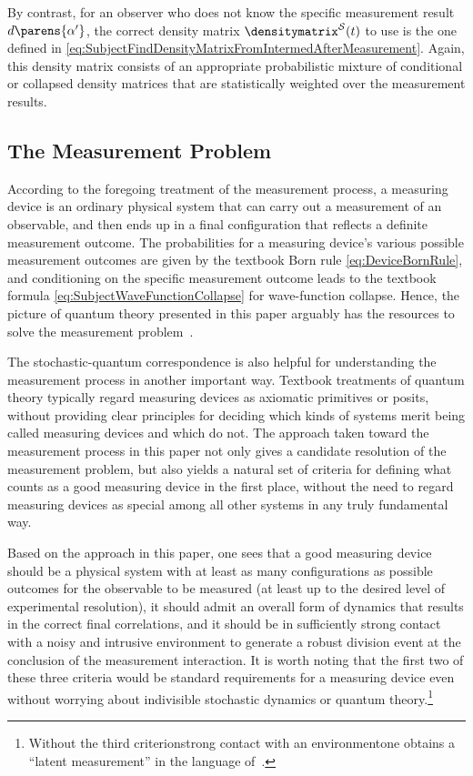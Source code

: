 \documentclass[12pt,english,prl,superscriptaddress,nobibnotes,nofootinbib]{revtex4-2}
\let\originalleft\left
\let\originalright\right
\renewcommand{\left}{\mathopen{}\mathclose\bgroup\originalleft}
\renewcommand{\right}{\aftergroup\egroup\originalright}
\begin{document}
By contrast, for an observer who does not know the specific measurement
result $d\parens{\alpha^{\prime}}$, the correct density matrix $\densitymatrix^{\mathcal{S}}\left(t\right)$
to use is the one defined in \eqref{eq:SubjectFindDensityMatrixFromIntermedAfterMeasurement}.
Again, this density matrix consists of an appropriate probabilistic
mixture of conditional or collapsed density matrices that are statistically
weighted over the measurement results.

\subsection{The Measurement Problem\label{subsec:The-Measurement-Problem}}

According to the foregoing treatment of the measurement process, a
measuring device is an ordinary physical system that can carry out
a measurement of an observable, and then ends up in a final configuration
that reflects a definite measurement outcome. The probabilities for
a measuring device's various possible measurement outcomes are given
by the textbook Born rule \eqref{eq:DeviceBornRule}, and conditioning
on the specific measurement outcome leads to the textbook formula
\eqref{eq:SubjectWaveFunctionCollapse} for wave-function collapse.
Hence, the picture of quantum theory presented in this paper arguably
has the resources to solve the measurement problem~\citep{Myrvold:2022piiqt}. 

The stochastic-quantum correspondence is also helpful for understanding
the measurement process in another important way. Textbook treatments
of quantum theory typically regard measuring devices as axiomatic
 primitives or posits, without providing clear principles for deciding
which kinds of systems merit being called measuring devices and which
do not. The approach taken toward the measurement process in this
paper not only gives a candidate resolution of the measurement problem,
but also yields a natural set of criteria for defining what counts
as a good measuring device in the first place, without the need to
regard measuring devices as special among all other systems in any
truly fundamental way.

Based on the approach in this paper, one sees that a good measuring
device should be a physical system with at least as many configurations
as possible outcomes for the observable to be measured (at least up
to the desired level of experimental resolution), it should admit
an overall form of dynamics that results in the correct final correlations,
and it should be in sufficiently strong contact with a noisy and intrusive
environment to generate a robust division event at the conclusion
of the measurement interaction. It is worth noting that the first
two of these three criteria would be standard requirements for a measuring
device even without worrying about indivisible stochastic dynamics
or quantum theory.\footnote{Without the third criterion\textemdash strong contact with an environment\textemdash one
obtains a ``latent measurement'' in the language of~\citep{Dicke:1989qmsal,GlickAdami:2020manmqm}.}
\end{document}
